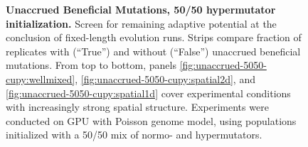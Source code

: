 \begin{figure}[h]
  \begin{minipage}{\textwidth}
    \caption{%
      \textbf{Unaccrued Beneficial Mutations, 50/50 hypermutator initialization.}
      \footnotesize
      Screen for remaining adaptive potential at the conclusion of fixed-length evolution runs.
      Strips compare fraction of replicates with (``True'') and without (``False'') unaccrued beneficial mutations.
      From top to bottom, panels \ref{fig:unaccrued-5050-cupy:wellmixed}, \ref{fig:unaccrued-5050-cupy:spatial2d}, and \ref{fig:unaccrued-5050-cupy:spatial1d} cover experimental conditions with increasingly strong spatial structure.
      Experiments were conducted on GPU with Poisson genome model, using populations initialized with a 50/50 mix of normo- and hypermutators.
    }
    \label{fig:unaccrued-5050-cupy}
  \end{minipage}
\end{figure}
